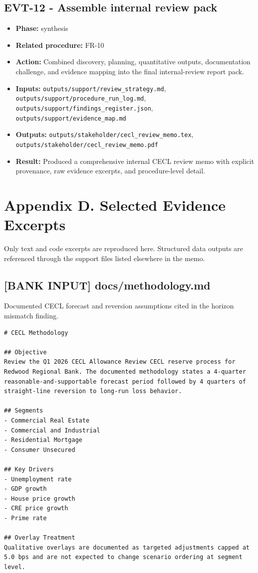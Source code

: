 \documentclass[11pt]{article}
\begin{document}
\subsection*{EVT-12 - Assemble internal review pack}
\begin{itemize}
\item \textbf{Phase:} synthesis
\item \textbf{Related procedure:} FR-10
\item \textbf{Action:} Combined discovery, planning, quantitative outputs, documentation challenge, and evidence mapping into the final internal-review report pack.
\item \textbf{Inputs:} \texttt{outputs/support/review\_strategy.md}, \texttt{outputs/support/procedure\_run\_log.md}, \texttt{outputs/support/findings\_register.json}, \texttt{outputs/support/evidence\_map.md}
\item \textbf{Outputs:} \texttt{outputs/stakeholder/cecl\_review\_memo.tex}, \texttt{outputs/stakeholder/cecl\_review\_memo.pdf}
\item \textbf{Result:} Produced a comprehensive internal CECL review memo with explicit provenance, raw evidence excerpts, and procedure-level detail.
\end{itemize}
\section*{Appendix D. Selected Evidence Excerpts}
Only text and code excerpts are reproduced here. Structured data outputs are referenced through the support files listed elsewhere in the memo.
\subsection*{[BANK INPUT] docs/methodology.md}
Documented CECL forecast and reversion assumptions cited in the horizon mismatch finding.
\begin{Verbatim}[fontsize=\small]
# CECL Methodology

## Objective
Review the Q1 2026 CECL Allowance Review CECL reserve process for Redwood Regional Bank. The documented methodology states a 4-quarter reasonable-and-supportable forecast period followed by 4 quarters of straight-line reversion to long-run loss behavior.

## Segments
- Commercial Real Estate
- Commercial and Industrial
- Residential Mortgage
- Consumer Unsecured

## Key Drivers
- Unemployment rate
- GDP growth
- House price growth
- CRE price growth
- Prime rate

## Overlay Treatment
Qualitative overlays are documented as targeted adjustments capped at 5.0 bps and are not expected to change scenario ordering at segment level.
\end{Verbatim}
\end{document}
